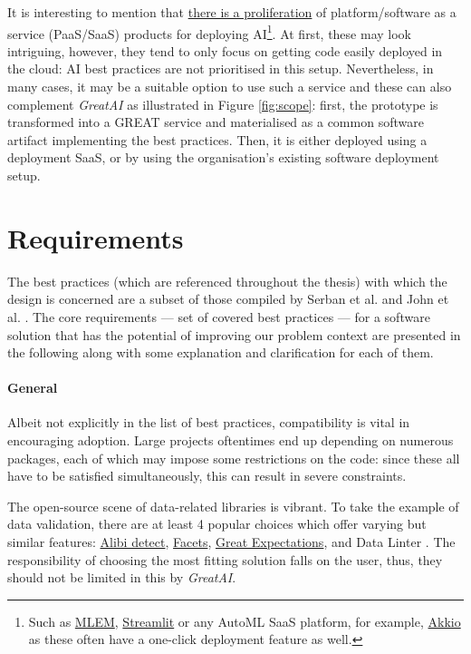 It is interesting to mention that \href{https://xkcd.com/927/}{there is a proliferation} of platform/software as a service (PaaS/SaaS) products for deploying AI\footnote{Such as \href{https://mlem.ai/}{MLEM}, \href{https://streamlit.io/cloud}{Streamlit} or any AutoML SaaS platform, for example, \href{https://www.akkio.com/role/software-engineers}{Akkio} as these often have a one-click deployment feature as well.}. At first, these may look intriguing, however, they tend to only focus on getting code easily deployed in the cloud: AI best practices are not prioritised in this setup. Nevertheless, in many cases, it may be a suitable option to use such a service and these can also complement \textit{GreatAI} as illustrated in Figure \ref{fig:scope}: first, the prototype is transformed into a GREAT service and materialised as a common software artifact implementing the best practices. Then, it is either deployed using a deployment SaaS, or by using the organisation's existing software deployment setup.

\section{Requirements} \label{section:requirements}

The best practices (which are referenced throughout the thesis) with which the design is concerned are a subset of those compiled by Serban et al. \cite{serban2020adoption,serban2021practices} and John et al. \cite{john2020architecting}. The core requirements --- set of covered best practices --- for a software solution that has the potential of improving our problem context are presented in the following along with some explanation and clarification for each of them.

\paragraph{General} Albeit not explicitly in the list of best practices, compatibility is vital in encouraging adoption. Large projects oftentimes end up depending on numerous packages, each of which may impose some restrictions on the code: since these all have to be satisfied simultaneously, this can result in severe constraints. 

The open-source scene of data-related libraries is vibrant. To take the example of data validation, there are at least 4 popular choices which offer varying but similar features: \href{https://github.com/SeldonIO/alibi-detect}{Alibi detect}, \href{https://github.com/PAIR-code/facets}{Facets}, \href{https://github.com/great-expectations/great_expectations}{Great Expectations}, and Data Linter \cite{hynes2017data}. The responsibility of choosing the most fitting solution falls on the user, thus, they should not be limited in this by \textit{GreatAI}. 

